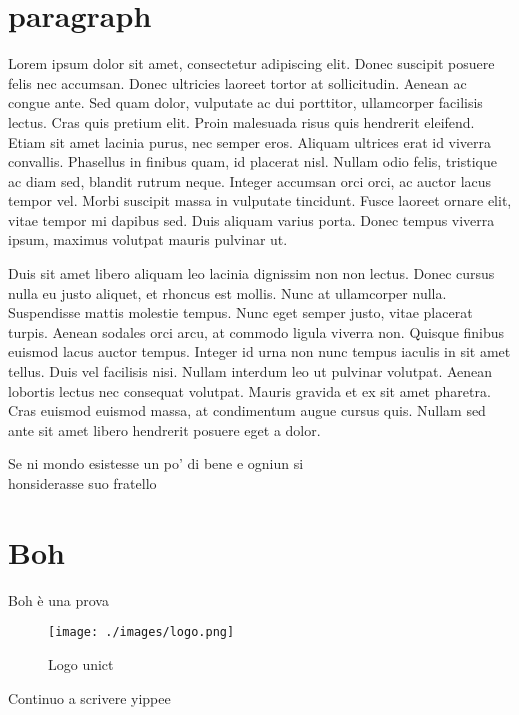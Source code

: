 
\section{paragraph}
Lorem ipsum dolor sit amet, consectetur adipiscing elit. Donec suscipit posuere felis nec accumsan. Donec ultricies laoreet tortor at sollicitudin. Aenean ac congue ante. Sed quam dolor, vulputate ac dui porttitor, ullamcorper facilisis lectus. Cras quis pretium elit. Proin malesuada risus quis hendrerit eleifend. Etiam sit amet lacinia purus, nec semper eros. Aliquam ultrices erat id viverra convallis. Phasellus in finibus quam, id placerat nisl. Nullam odio felis, tristique ac diam sed, blandit rutrum neque. Integer accumsan orci orci, ac auctor lacus tempor vel. Morbi suscipit massa in vulputate tincidunt. Fusce laoreet ornare elit, vitae tempor mi dapibus sed. Duis aliquam varius porta. Donec tempus viverra ipsum, maximus volutpat mauris pulvinar ut.

Duis sit amet libero aliquam leo lacinia dignissim non non lectus. Donec cursus nulla eu justo aliquet, et rhoncus est mollis. Nunc at ullamcorper nulla. Suspendisse mattis molestie tempus. Nunc eget semper justo, vitae placerat turpis. Aenean sodales orci arcu, at commodo ligula viverra non. Quisque finibus euismod lacus auctor tempus. Integer id urna non nunc tempus iaculis in sit amet tellus. Duis vel facilisis nisi. Nullam interdum leo ut pulvinar volutpat. Aenean lobortis lectus nec consequat volutpat. Mauris gravida et ex sit amet pharetra. Cras euismod euismod massa, at condimentum augue cursus quis. Nullam sed ante sit amet libero hendrerit posuere eget a dolor. 

Se ni mondo esistesse un po' di bene e ogniun si \\honsiderasse suo 
fratello

\section{Boh}
Boh è una prova\\
\begin{figure}[h]
    \texttt{[image: ./images/logo.png]}
    \centering
    \caption{Logo unict}
    \label{fig: logo1}
\end{figure}

Continuo a scrivere yippee